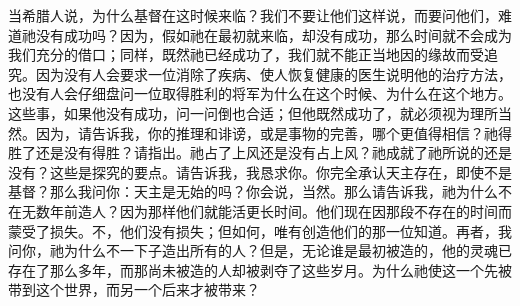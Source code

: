 当希腊人说，为什么基督在这时候来临？我们不要让他们这样说，而要问他们，难道祂没有成功吗？因为，假如祂在最初就来临，却没有成功，那么时间就不会成为我们充分的借口；同样，既然祂已经成功了，我们就不能正当地因的缘故而受追究。因为没有人会要求一位消除了疾病、使人恢复健康的医生说明他的治疗方法，也没有人会仔细盘问一位取得胜利的将军为什么在这个时候、为什么在这个地方。这些事，如果他没有成功，问一问倒也合适；但他既然成功了，就必须视为理所当然。因为，请告诉我，你的推理和诽谤，或是事物的完善，哪个更值得相信？祂得胜了还是没有得胜？请指出。祂占了上风还是没有占上风？祂成就了祂所说的还是没有？这些是探究的要点。请告诉我，我恳求你。你完全承认天主存在，即使不是基督？那么我问你：天主是无始的吗？你会说，当然。那么请告诉我，祂为什么不在无数年前造人？因为那样他们就能活更长时间。他们现在因那段不存在的时间而蒙受了损失。不，他们没有损失；但如何，唯有创造他们的那一位知道。再者，我问你，祂为什么不一下子造出所有的人？但是，无论谁是最初被造的，他的灵魂已存在了那么多年，而那尚未被造的人却被剥夺了这些岁月。为什么祂使这一个先被带到这个世界，而另一个后来才被带来？\par

